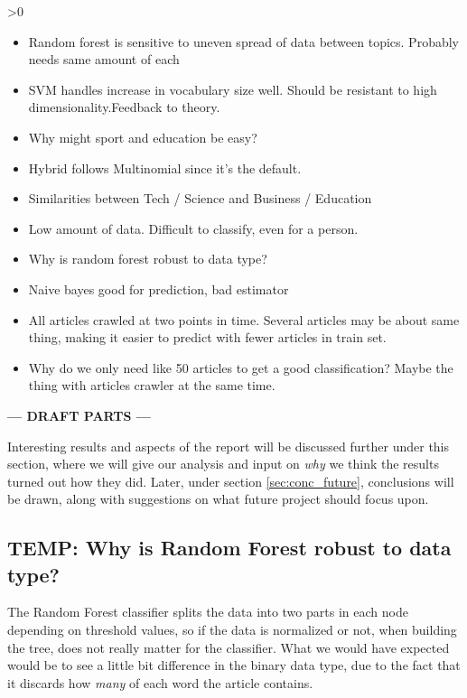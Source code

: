 \ifnum\printdraft>0
	\begin{itemize}
		\item Random forest is sensitive to uneven spread of data between topics. Probably needs same amount of each
		\item SVM handles increase in vocabulary size well. Should be resistant to high dimensionality.Feedback to theory.
		\item Why might sport and education be easy?
		\item Hybrid follows Multinomial since it's the default.
		\item Similarities between Tech / Science and Business / Education
		\item Low amount of data. Difficult to classify, even for a person.
		\item Why is random forest robust to data type?
		\item Naive bayes good for prediction, bad estimator
		\item All articles crawled at two points in time. Several articles may be about same thing, making it easier to predict with fewer articles in train set.
		\item Why do we only need like 50 articles to get a good classification? Maybe the thing with articles crawler at the same time.
	\end{itemize}
\else
\begin{center}
	\textbf{--- DRAFT PARTS ---}
\end{center}
\fi
Interesting results and aspects of the report will be discussed further under this section, where we will give our analysis and input on \emph{why} we think the results turned out how they did. Later, under section \ref{sec:conc_future}, conclusions will be drawn, along with suggestions on what future project should focus upon.
\subsection{TEMP: Why is Random Forest robust to data type?} %
\label{sub:temp_why_is_random_forest_robust_to_data_type_}
The Random Forest classifier splits the data into two parts in each node depending on threshold values, so if the data is normalized or not, when building the tree, does not really matter for the classifier. What we would have expected would be to see a little bit difference in the binary data type, due to the fact that it discards how \emph{many} of each word the article contains.

